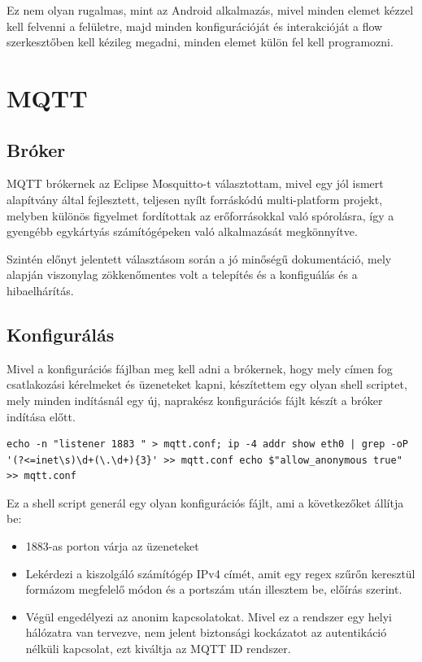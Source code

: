 \documentclass[
]{thesis-ekf}
\theoremstyle{definition}
\theoremstyle{remark}
\begin{document}
Ez nem olyan rugalmas, mint az Android alkalmazás, mivel minden
elemet kézzel kell felvenni a felületre, majd minden konfigurációját és interakcióját a flow szerkesztőben kell kézileg megadni, minden elemet külön fel kell programozni.

\section{MQTT}
\subsection{Bróker}
MQTT brókernek az Eclipse Mosquitto\cite{mosquitto}-t választottam, mivel egy jól ismert alapítvány által fejlesztett, teljesen nyílt forráskódú multi-platform projekt,
melyben különös figyelmet fordítottak az erőforrásokkal való spórolásra, így a gyengébb egykártyás számítógépeken való alkalmazását megkönnyítve. 

Szintén előnyt jelentett választásom során a jó minőségű dokumentáció, mely alapján
viszonylag zökkenőmentes volt a telepítés és a konfiguálás és a hibaelhárítás.
\subsection{Konfigurálás}
Mivel a konfigurációs fájlban meg kell adni a brókernek, hogy mely címen fog csatlakozási kérelmeket és üzeneteket kapni,
készítettem egy olyan shell scriptet, mely minden indításnál egy új, naprakész konfigurációs fájlt készít a bróker indítása előtt.

\lstset{language=bash} 
\label{configGenerator}
\begin{lstlisting}[frame=single]
echo -n "listener 1883 " > mqtt.conf; ip -4 addr show eth0 | grep -oP '(?<=inet\s)\d+(\.\d+){3}' >> mqtt.conf echo $"allow_anonymous true" >> mqtt.conf
\end{lstlisting}

Ez a shell script generál egy olyan konfigurációs fájlt, ami a következőket állítja be:
\begin{itemize}
	\item 1883-as porton várja az üzeneteket
	\item Lekérdezi a kiszolgáló számítógép IPv4 címét, amit egy regex szűrőn keresztül formázom megfelelő módon és a portszám után illesztem be, előírás szerint.
	\item Végül engedélyezi az anonim kapcsolatokat. Mivel ez a rendszer egy helyi hálózatra van tervezve, nem jelent biztonsági kockázatot az autentikáció nélküli kapcsolat, ezt kiváltja az MQTT ID rendszer.
\end{itemize}
\end{document}
